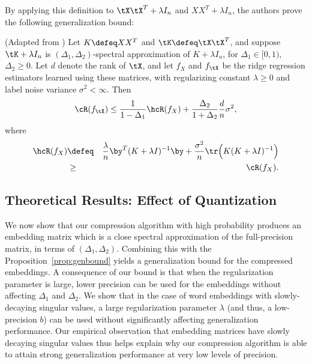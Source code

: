 By applying this definition to $\tX\tX^T + \lambda I_n$ and $XX^T + \lambda I_n$, the authors prove the following generalization bound:
\begin{proposition}{(Adapted from \citep{lprff18})}
	Let $K \defeq XX^T$ and $\tK \defeq \tX\tX^T$, and suppose $\tK + \lambda I_n$ is $(\Delta_1, \Delta_2)$-spectral approximation of $K+\lambda I_n$, for $\Delta_1 \in [0,1)$, $\Delta_2 \geq 0$.
	Let $d$ denote the rank of $\tX$, and let $f_{X}$ and $f_{\tX}$ be the ridge regression estimators learned using these matrices, with regularizing constant $\lambda \geq 0$ and label noise variance $\sigma^2 < \infty$. Then
	\begin{equation}
	\cR(f_{\tX}) \leq \frac{1}{1-\Delta_1} \hcR(f_X) +  \frac{\Delta_2}{1+\Delta_2}\frac{d}{n}\sigma^2,
	\label{eq:risk_bound}
	\end{equation}
	where 
	\begin{eqnarray*}
	\hcR(f_X) &\defeq& \frac{\lambda}{n} \by^T(K+\lambda I)^{-1}\by + \frac{\sigma^2}{n}\tr\Big(K(K+\lambda I)^{-1}\Big) \\
	&\geq& \cR(f_X).
	\end{eqnarray*}
	\label{prop:genbound}
\end{proposition}

\subsection{Theoretical Results: Effect of Quantization}
\label{sec:theory_quantization}
We now show that our compression algorithm with high probability produces an embedding matrix which is a close spectral approximation of the full-precision matrix, in terms of $(\Delta_1,\Delta_2)$.
Combining this with the Proposition~\ref{prop:genbound} yields a generalization bound for the compressed embeddings.
A consequence of our bound is that when the regularization parameter is large, lower precision can be used for the embeddings without affecting $\Delta_1$ and $\Delta_2$.
We show that in the case of word embeddings with slowly-decaying singular values, a large regularization parameter $\lambda$ (and thus, a low-precision $b$) can be used without significantly affecting generalization performance.
Our empirical observation that embedding matrices have slowly decaying singular values thus helps explain why our compression algorithm is able to attain strong generalization performance at very low levels of precision.

